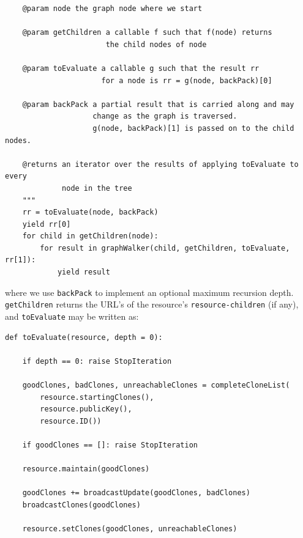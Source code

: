 \documentclass[11pt]{article}
\begin{document}
\begin{mainmatter}
\begin{verbatim}
    @param node the graph node where we start
    
    @param getChildren a callable f such that f(node) returns 
                       the child nodes of node
                       
    @param toEvaluate a callable g such that the result rr
                      for a node is rr = g(node, backPack)[0]
    
    @param backPack a partial result that is carried along and may 
                    change as the graph is traversed. 
                    g(node, backPack)[1] is passed on to the child nodes.
                    
    @returns an iterator over the results of applying toEvaluate to every 
             node in the tree
    """
    rr = toEvaluate(node, backPack)
    yield rr[0]
    for child in getChildren(node):
        for result in graphWalker(child, getChildren, toEvaluate, rr[1]):
            yield result
\end{verbatim}
where we use \texttt{backPack} to implement an optional maximum recursion depth. \texttt{getChildren} returns the URL's of the resource's \texttt{resource-children} (if any), and \texttt{toEvaluate} may be written as:
\begin{verbatim}
def toEvaluate(resource, depth = 0):

    if depth == 0: raise StopIteration
    
    goodClones, badClones, unreachableClones = completeCloneList(
        resource.startingClones(), 
        resource.publicKey(), 
        resource.ID())
    
    if goodClones == []: raise StopIteration

    resource.maintain(goodClones)
   
    goodClones += broadcastUpdate(goodClones, badClones)
    broadcastClones(goodClones)
    
    resource.setClones(goodClones, unreachableClones)


\end{verbatim}
\end{mainmatter}
\end{document}
